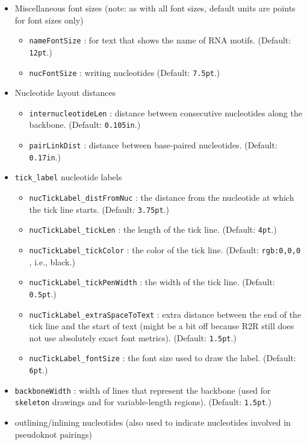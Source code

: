 \documentclass[letterpaper,12pt]{report}
\begin{document}
\begin{itemize}
\item Miscellaneous font sizes (note: as with all font sizes, default units are points for font sizes only)
	\begin{itemize}
	\item {\tt nameFontSize} : for text that shows the name of RNA motifs. (Default: {\tt 12pt}.)
	\item {\tt nucFontSize} : writing nucleotides (Default: {\tt 7.5pt}.)
	\end{itemize}
\item Nucleotide layout distances
	\begin{itemize}
	\item \label{internucleotideLen}{\tt internucleotideLen} : distance between consecutive nucleotides along the backbone.  (Default: {\tt 0.105in}.)
	\item {\tt pairLinkDist} : distance between base-paired nucleotides. (Default: {\tt 0.17in}.)
	\end{itemize}
\item {\tt tick\_label} nucleotide labels
	\begin{itemize}
	\item {\tt nucTickLabel\_distFromNuc} : the distance from the nucleotide at which the tick line starts. (Default: {\tt 3.75pt}.)
	\item {\tt nucTickLabel\_tickLen} : the length of the tick line. (Default: {\tt 4pt}.)
	\item {\tt nucTickLabel\_tickColor} : the color of the tick line. (Default: {\tt rgb:0,0,0} , i.e., black.)
	\item {\tt nucTickLabel\_tickPenWidth} : the width of the tick line. (Default: {\tt 0.5pt}.)
	\item {\tt nucTickLabel\_extraSpaceToText} : extra distance between the end of the tick line and the start of text (might be a bit off because R2R still does not use absolutely exact font metrics). (Default: {\tt 1.5pt}.)
	\item {\tt nucTickLabel\_fontSize} : the font size used to draw the label. (Default: {\tt 6pt}.)
	\end{itemize}
\item {\tt backboneWidth} : width of lines that represent the backbone (used for {\tt skeleton} drawings and for variable-length regions). (Default: {\tt 1.5pt}.)
\item outlining/inlining nucleotides (also used to indicate nucleotides involved in pseudoknot pairings)

\end{itemize}
\end{document}
